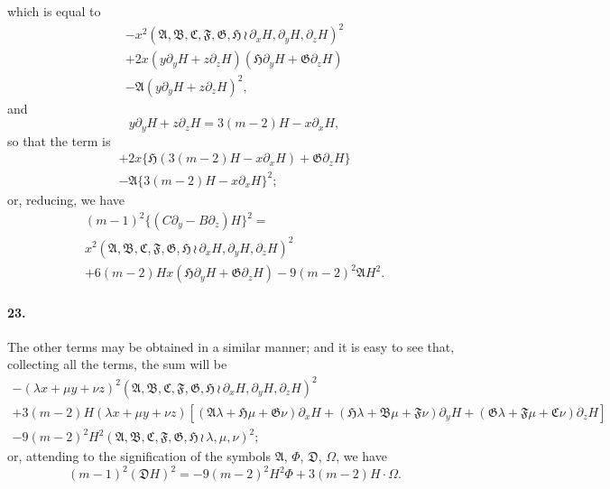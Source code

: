 \documentclass[11pt,a4paper]{book}
\begin{document}
which  is  equal  to
\begin{multline*}
-x^2 (\mathfrak{A}, \mathfrak{B}, \mathfrak{C}, \mathfrak{F}, \mathfrak{G}, \mathfrak{H} \,\!\!\wr\, \partial_x H, \partial_y H, \partial_z H)^2 \\
+ 2x (y\partial_y H + z\partial_z H)(\mathfrak{H}\partial_y H + \mathfrak{G}\partial_z H) \\
- \mathfrak{A} (y\partial_y H + z\partial_z H)^2,
\end{multline*}
and
\[
y\partial_y H + z\partial_z H = 3(m-2)H - x\partial_x H,
\]
so   that   the   term   is
\begin{multline*}
+ 2x\{\mathfrak{H}(3(m-2)H - x\partial_x H) + \mathfrak{G}\partial_z H\} \\
- \mathfrak{A}\{3(m-2)H - x\partial_x H\}^2;
\end{multline*}
or,  reducing,  we  have
\begin{multline*}
(m-1)^2 \{(C\partial_y - B\partial_z)H\}^2 = \\
x^2 (\mathfrak{A}, \mathfrak{B}, \mathfrak{C}, \mathfrak{F}, \mathfrak{G}, \mathfrak{H} \,\!\!\wr\, \partial_x H, \partial_y H, \partial_z H)^2 \\
+ 6(m-2)Hx(\mathfrak{H}\partial_y H + \mathfrak{G}\partial_z H) - 9(m-2)^2 \mathfrak{A} H^2.
\end{multline*}

\paragraph{23.}
The    other  terms  may   be   obtained   in   a   similar   manner;    and    it    is    easy    to
see  that,  collecting  all  the  terms,  the  sum  will  be
\begin{multline*}
-(\lambda x + \mu y + \nu z)^2 (\mathfrak{A}, \mathfrak{B}, \mathfrak{C}, \mathfrak{F}, \mathfrak{G}, \mathfrak{H} \,\!\!\wr\, \partial_x H, \partial_y H, \partial_z H)^2 \\
+ 3(m-2)H(\lambda x + \mu y + \nu z)
  [(\mathfrak{A}\lambda + \mathfrak{H}\mu + \mathfrak{G}\nu)\partial_x H
  + (\mathfrak{H}\lambda + \mathfrak{B}\mu + \mathfrak{F}\nu)\partial_y H
  + (\mathfrak{G}\lambda + \mathfrak{F}\mu + \mathfrak{C}\nu)\partial_z H] \\
- 9(m-2)^2 H^2 (\mathfrak{A}, \mathfrak{B}, \mathfrak{C}, \mathfrak{F}, \mathfrak{G}, \mathfrak{H} \,\!\!\wr\, \lambda, \mu, \nu)^2;
\end{multline*}
or,  attending  to  the  signification  of  the  symbols  $\mathfrak{A}$,  $\Phi$,  $\mathfrak{D}$,  $\Omega$,  we  have
\[
(m-1)^2 (\mathfrak{D} H)^2 = -9(m-2)^2 H^2 \Phi + 3(m-2)H \cdot \Omega.
\]
\end{document}
